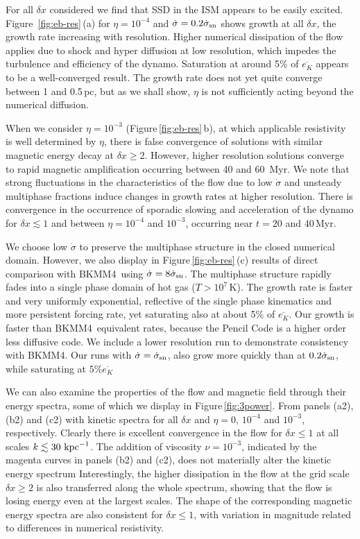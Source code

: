 \documentclass[preprint2]{aastex63}
\newcommand\SNr{\dot\sigma_{\rm sn}}
\newcommand\kpc{~ {\rm kpc}}
\newcommand\dx{ {\delta x}}
\newcommand\BKM{{\sf BKMM4}}
\newcommand{\fg}[1]{\textcolor{midgreen}{#1}}
\begin{document}
\fg{For all $\dx$ considered we find that SSD in the
 ISM appears to be easily excited.
 Figure~\ref{fig:eb-res}\,(a) for $\eta=10^{-4}$ and $\dot\sigma=0.2\SNr$
 shows growth at all $\dx$, the growth rate increasing with resolution.
 Higher numerical dissipation of the flow applies due to shock and hyper
 diffusion at low resolution, which impedes the turbulence and efficiency of
 the dynamo.
 Saturation at around 5\% of $\overline{e_K}$ appears to be a well-converged
 result.
 The growth rate does not yet quite converge between 1 and 0.5\,pc, but as we
 shall show, $\eta$ is not sufficiently acting beyond the numerical diffusion.}

 \fg{When we consider} $\eta=10^{-3}$ \fg{(Figure\,\ref{fig:eb-res}\,b), at which
 applicable resistivity is well determined by $\eta$,} there is false
 convergence
 \citep{FMA91} of solutions with similar magnetic energy decay at $\dx\geq2$.
 However, higher resolution solutions converge to rapid magnetic
 amplification occurring between 40 and 60~Myr.
 \fg{We note that strong fluctuations in the characteristics of the flow due to
 low $\dot\sigma$ and unsteady multiphase fractions induce changes in growth
 rates at higher resolution.
 There is convergence in the occurrence of sporadic slowing and acceleration
 of the dynamo for $\dx\lesssim1$ and between $\eta=10^{-4}$ and $10^{-3}$,
 occurring near $t=20$ and 40\,Myr.
 }
  
 \fg{We choose low $\dot\sigma$ to preserve the multiphase structure in the 
 closed numerical domain. 
 However, we also display in Figure\,\ref{fig:eb-res}\,(c) results of direct
 comparison with \BKM\ using $\dot\sigma=8\SNr$.
 The multiphase structure rapidly fades into a single phase domain of hot gas
 ($T>10^7$\,K).
 The growth rate is faster and very uniformly exponential, reflective of the
 single phase kinematics and more persistent forcing rate, yet saturating
 also at about 5\% of $\overline{e_K}$.
 Our growth is faster than \BKM\ equivalent rates, because the Pencil Code is a
 higher order less diffusive code.
 We include a lower resolution run to demonstrate consistency with \BKM.
 Our runs with $\dot\sigma=\SNr$, also grow more quickly than at $0.2\SNr$,
 while saturating at $5\%\overline{e_K}$}%

 \fg{We can also examine the properties of the flow and magnetic field through
 their energy spectra, some of which we display in Figure\,\ref{fig:3power}.
 From panels (a2), (b2) and (c2) with kinetic spectra for all $\dx$ and 
 $\eta=0$, $10^{-4}$ and $10^{-3}$, respectively.
 Clearly there is excellent convergence in the flow for $\dx\leq1$ at all
 scales $k\lesssim 30\kpc^{-1}$.
 The addition of viscosity $\nu=10^{-3}$, indicated by the magenta curves in
 panels (b2) and (c2), does not materially alter the kinetic energy spectrum
 Interestingly, the higher dissipation in the flow at the grid scale 
 $\dx\geq2$ is also transferred along the whole spectrum, showing that
 the flow is losing energy even at the largest scales.
 The shape of the corresponding magnetic energy spectra are also consistent 
 for $\dx\leq1$, with variation in magnitude related to differences in
 numerical resistivity.
}
 
\end{document}
